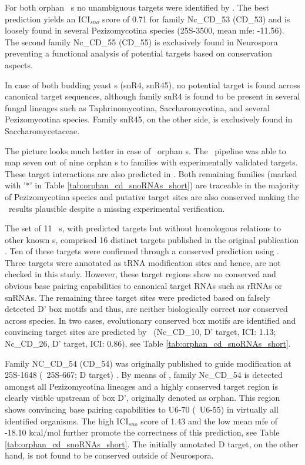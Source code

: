 For both orphan \ncr\ \sno s no unambiguous targets were identified by
\snostrip. The best prediction yields an ICI$_{sno}$ score of 0.71 for
family Nc\_CD\_53 (CD\_53) and is loosely found in several
Pezizomycotina species (25S-3500, mean mfe: -11.56). The second family
Nc\_CD\_55 (CD\_55) is exclusively found in Neurospora preventing a
functional analysis of potential targets based on conservation
aspects.

In case of both budding yeast \sno s (snR4, snR45), no potential
target is found across canonical target sequences, although family
snR4 is found to be present in several fungal lineages such as
Taphrinomycotina, Saccharomycotina, and several Pezizomycotina
species. Family snR45, on the other side, is exclusively found in
Saccharomycetaceae.

The picture looks much better in case of \afu\ orphan \sno s. The
\snostrip\ pipeline was able to map seven out of nine orphan \cd s to
families with experimentally validated targets. These target
interactions are also predicted in \afu. Both remaining families
(marked with '*' in Table \ref{tab:orphan_cd_snoRNAs_short}) are
traceable in the majority of Pezizomycotina species and putative
target sites are also conserved making the \snostrip\ results
plausible despite a missing experimental verification.

The set of 11 \ncr\ \sno s, with predicted targets but without
homologous relations to other known \sno s, comprised 16 distinct
targets published in the original publication \cite{Li:2005}.  Ten of
these targets were confirmed through a conserved prediction using
\snostrip.  Three targets were annotated as tRNA modification sites
and hence, are not checked in this study. However, these target
regions show no conserved and obvious base pairing capabilities to
canonical target RNAs such as rRNAs or snRNAs. The remaining three
target sites were predicted based on falsely detected D' box motifs
and thus, are neither biologically correct nor conserved across
species. In two cases, evolutionary conserved box motifs are
identified and convincing target sites are predicted by \snostrip\
(Nc\_CD\_10, D' target, ICI: 1.13; Nc\_CD\_26, D' target, ICI: 0.86),
see Table \ref{tab:orphan_cd_snoRNAs_short}.

Family NC\_CD\_54 (CD\_54) was originally published to guide
modification at 25S-1648 (\ncr\ 25S-667; D target) \cite{Liu:2009}. By
means of \snostrip, family Nc\_CD\_54 is detected amongst all
Pezizomycotina lineages and a highly conserved target region is
clearly visible upstream of box D', originally denoted as orphan. This
region shows convincing base pairing capabilities to U6-70 (\ncr\
U6-55) in virtually all identified organisms. The high ICI$_{sno}$
score of 1.43 and the low mean mfe of -18.10 kcal/mol further promote
the correctness of this prediction, see Table
\ref{tab:orphan_cd_snoRNAs_short}. The initially annotated D target,
on the other hand, is not found to be conserved outside of Neurospora.

